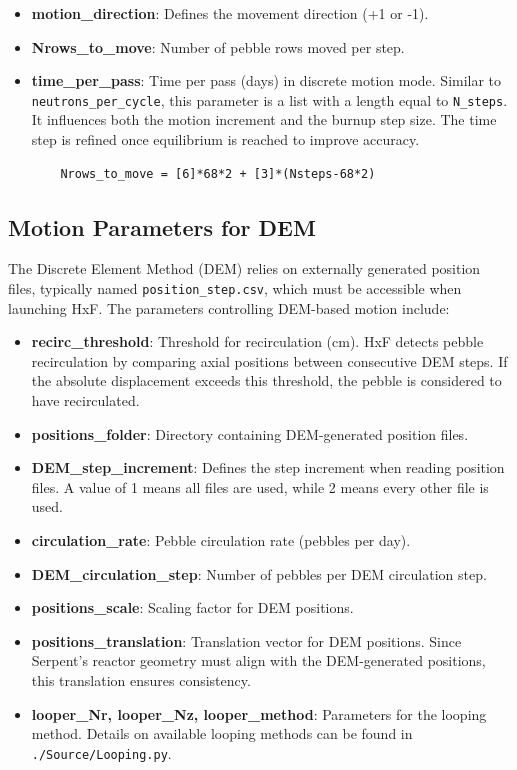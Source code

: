 \documentclass{article}
\begin{document}
\begin{itemize}
    \item \textbf{motion\_direction}: Defines the movement direction (+1 or -1).
    \item \textbf{Nrows\_to\_move}: Number of pebble rows moved per step.
    \item \textbf{time\_per\_pass}: Time per pass (days) in discrete motion mode. Similar to \texttt{neutrons\_per\_cycle}, this parameter is a list with a length equal to \texttt{N\_steps}. It influences both the motion increment and the burnup step size. The time step is refined once equilibrium is reached to improve accuracy.

\begin{verbatim}
    Nrows_to_move = [6]*68*2 + [3]*(Nsteps-68*2)
\end{verbatim}

\end{itemize}

\subsection{Motion Parameters for DEM}
The Discrete Element Method (DEM) relies on externally generated position files, typically named \texttt{position\_step.csv}, which must be accessible when launching HxF. The parameters controlling DEM-based motion include:

\begin{itemize}
    \item \textbf{recirc\_threshold}: Threshold for recirculation (cm). HxF detects pebble recirculation by comparing axial positions between consecutive DEM steps. If the absolute displacement exceeds this threshold, the pebble is considered to have recirculated.
    \item \textbf{positions\_folder}: Directory containing DEM-generated position files.
    \item \textbf{DEM\_step\_increment}: Defines the step increment when reading position files. A value of 1 means all files are used, while 2 means every other file is used.
    \item \textbf{circulation\_rate}: Pebble circulation rate (pebbles per day).
    \item \textbf{DEM\_circulation\_step}: Number of pebbles per DEM circulation step.
    \item \textbf{positions\_scale}: Scaling factor for DEM positions.
    \item \textbf{positions\_translation}: Translation vector for DEM positions. Since Serpent's reactor geometry must align with the DEM-generated positions, this translation ensures consistency.
    \item \textbf{looper\_Nr, looper\_Nz, looper\_method}: Parameters for the looping method. Details on available looping methods can be found in \texttt{./Source/Looping.py}.
\end{itemize}
\end{document}
